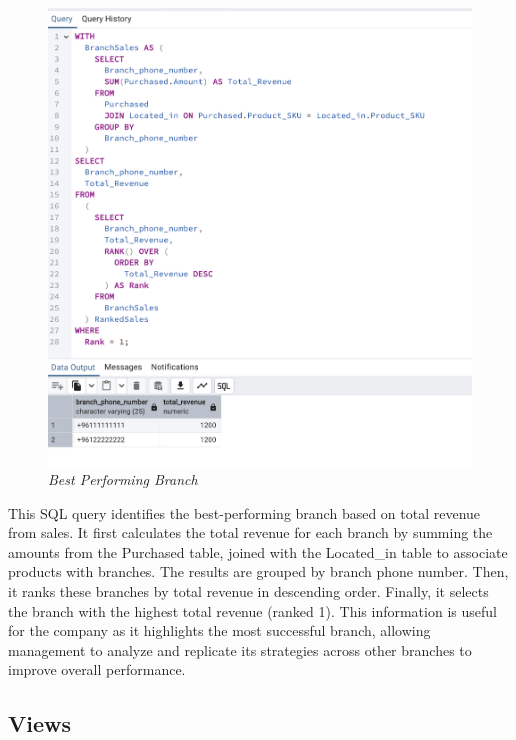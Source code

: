 


\begin{figure}[H]
  \centering
  \includegraphics[width=1\textwidth]{images/sql/complex-queries/best_performing_branch.png}
  \caption{\textit{Best Performing Branch}}
\end{figure}

This SQL query identifies the best-performing branch based on total revenue from sales. It first calculates the total revenue for each branch by summing the amounts from the Purchased table, joined with the Located\_in table to associate products with branches. The results are grouped by branch phone number. Then, it ranks these branches by total revenue in descending order. Finally, it selects the branch with the highest total revenue (ranked 1). This information is useful for the company as it highlights the most successful branch, allowing management to analyze and replicate its strategies across other branches to improve overall performance.

\subsection{Views}


